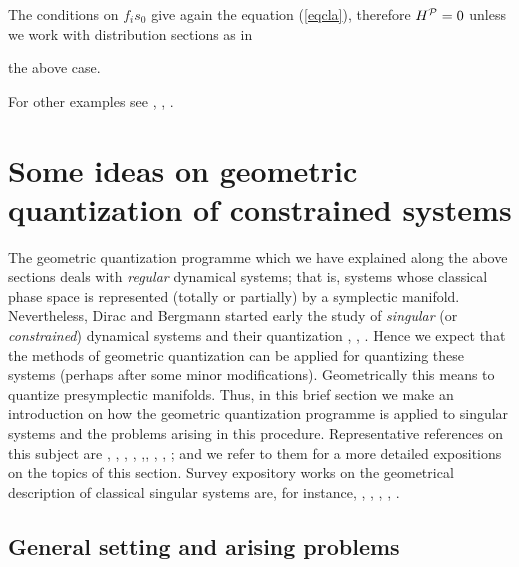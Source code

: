 \documentclass[12pt]{article}
\begin{document}
The conditions on $f_is_0$ give again the equation (\ref{eqcla}),
therefore $H^{\cal P}=0$ unless we work with distribution sections as in

the above case.

For other examples see \cite{Sn-80}, \cite{Tu-85}, \cite{Wo-80}.




\section{Some ideas on geometric quantization of constrained systems}


The geometric quantization programme  which we have explained along the
above sections
deals with {\it regular} dynamical systems; that is,
systems whose classical phase space is represented
(totally or partially) by a symplectic manifold.
Nevertheless, Dirac and Bergmann started early the study of
{\it singular} (or {\it constrained}) dynamical systems
and their quantization \cite{BG-tps}, \cite{Di-rmp}, \cite{Di-lqm}.
Hence we expect that the methods of geometric quantization can
be applied for quantizing these systems (perhaps after some minor
modifications).
Geometrically this means to quantize presymplectic manifolds.
Thus, in this brief section we make an introduction on how
the geometric quantization programme is applied
to singular systems and the problems arising in this procedure.
Representative references on this subject are
\cite{AS-86}, \cite{Blau-88a}, \cite{Blau-88b}, \cite{Go-86},
\cite{GS-81},\cite{Lo-90}, \cite{Ml-89}, \cite{Sn-83}, \cite{Tu-91};
and we refer to them for a more detailed expositions on the topics of
this section.
Survey expository works on the geometrical description of classical
singular systems are, for instance,
\cite{BK-ymtcs}, \cite{Ca-tsl}, \cite{GNH-pca}, \cite{GP-ggf},
\cite{MR-gs}.



\subsection{General setting and arising problems}
\end{document}
